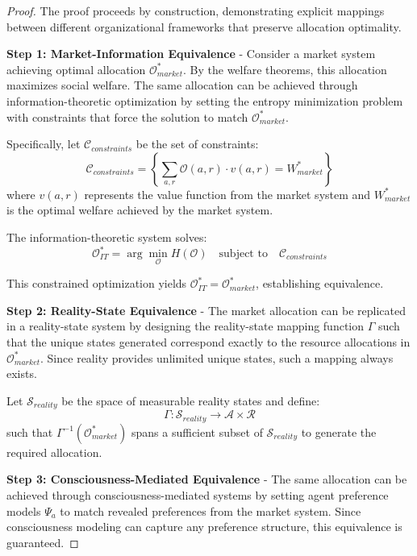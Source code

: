 \documentclass[12pt,a4paper]{article}
\begin{document}
\begin{proof}
The proof proceeds by construction, demonstrating explicit mappings between different organizational frameworks that preserve allocation optimality.

\textbf{Step 1: Market-Information Equivalence} - Consider a market system achieving optimal allocation $\mathcal{O}^*_{market}$. By the welfare theorems, this allocation maximizes social welfare. The same allocation can be achieved through information-theoretic optimization by setting the entropy minimization problem with constraints that force the solution to match $\mathcal{O}^*_{market}$.

Specifically, let $\mathcal{C}_{constraints}$ be the set of constraints:
\begin{equation}
\mathcal{C}_{constraints} = \left\{\sum_{a,r} \mathcal{O}(a,r) \cdot v(a,r) = W^*_{market}\right\}
\end{equation}
where $v(a,r)$ represents the value function from the market system and $W^*_{market}$ is the optimal welfare achieved by the market system.

The information-theoretic system solves:
\begin{equation}
\mathcal{O}^*_{IT} = \arg\min_{\mathcal{O}} H(\mathcal{O}) \quad \text{subject to} \quad \mathcal{C}_{constraints}
\end{equation}

This constrained optimization yields $\mathcal{O}^*_{IT} = \mathcal{O}^*_{market}$, establishing equivalence.

\textbf{Step 2: Reality-State Equivalence} - The market allocation can be replicated in a reality-state system by designing the reality-state mapping function $\Gamma$ such that the unique states generated correspond exactly to the resource allocations in $\mathcal{O}^*_{market}$. Since reality provides unlimited unique states, such a mapping always exists.

Let $\mathcal{S}_{reality}$ be the space of measurable reality states and define:
\begin{equation}
\Gamma: \mathcal{S}_{reality} \rightarrow \mathcal{A} \times \mathcal{R}
\end{equation}
such that $\Gamma^{-1}(\mathcal{O}^*_{market})$ spans a sufficient subset of $\mathcal{S}_{reality}$ to generate the required allocation.

\textbf{Step 3: Consciousness-Mediated Equivalence} - The same allocation can be achieved through consciousness-mediated systems by setting agent preference models $\Psi_a$ to match revealed preferences from the market system. Since consciousness modeling can capture any preference structure, this equivalence is guaranteed.


\end{proof}
\end{document}
